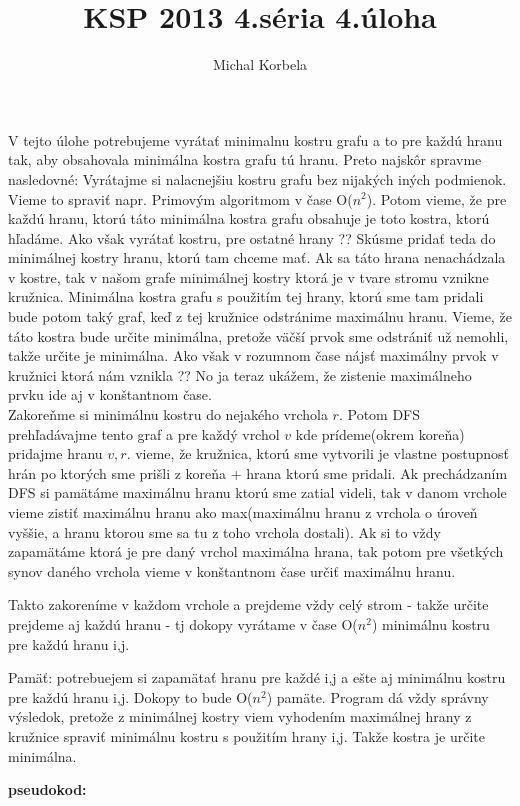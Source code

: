 \documentclass[a4paper,11pt]{article}
\title{KSP 2013 4.séria 4.úloha}
\author{Michal Korbela}
\begin{document}
V tejto úlohe potrebujeme vyrátať minimalnu kostru grafu a to pre každú hranu tak, aby obsahovala  minimálna kostra grafu tú hranu. Preto najskôr spravme nasledovné: Vyrátajme si nalacnejšiu kostru grafu bez nijakých iných podmienok. Vieme to spraviť napr. Primovým algoritmom v čase O($n^2$). Potom vieme, že pre každú hranu, ktorú táto minimálna kostra grafu obsahuje je toto kostra, ktorú hľadáme. Ako však vyrátať kostru, pre ostatné hrany ?? Skúsme pridať teda do minimálnej kostry hranu, ktorú tam chceme mať. Ak sa táto hrana nenachádzala v kostre, tak v našom grafe minimálnej kostry ktorá je v tvare stromu vznikne kružnica. Minimálna kostra grafu s použitím tej hrany, ktorú sme tam pridali bude potom taký graf, keď z tej kružnice odstránime maximálnu hranu. Vieme, že táto kostra bude určite minimálna, pretože väčší prvok sme odstrániť už nemohli, takže určite je minimálna. Ako však v rozumnom čase nájsť maximálny prvok v kružnici ktorá nám vznikla ?? No ja teraz ukážem, že zistenie maximálneho prvku ide aj v konštantnom čase.\\
Zakoreňme si minimálnu kostru do nejakého vrchola $r$. Potom DFS prehľadávajme tento graf a pre každý vrchol $v$ kde prídeme(okrem koreňa) pridajme hranu $v,r$. vieme, že kružnica, ktorú sme vytvorili je vlastne postupnosť hrán po ktorých sme prišli z koreňa + hrana ktorú sme pridali. Ak prechádzaním DFS si pamätáme maximálnu hranu ktorú sme zatial videli, tak v danom vrchole vieme zistiť maximálnu hranu ako max(maximálnu hranu z vrchola o úroveň vyššie, a hranu ktorou sme sa tu z toho vrchola dostali). Ak si to vždy zapamätáme ktorá je pre daný vrchol maximálna hrana, tak potom pre všetkých synov daného vrchola vieme v konštantnom čase určiť maximálnu hranu.

Takto zakoreníme v každom vrchole a prejdeme vždy celý strom - takže určite prejdeme aj každú hranu - tj dokopy vyrátame v čase O($n^2$) minimálnu kostru pre každú hranu i,j.

Pamäť: potrebuejem si zapamätať hranu pre každé i,j a ešte aj minimálnu kostru pre každú hranu i,j. Dokopy to bude O($n^2$) pamäte.
Program dá vždy správny výsledok, pretože z minimálnej kostry viem vyhodením maximálnej hrany z kružnice spraviť minimálnu kostru s použitím hrany i,j. Takže kostra je určite minimálna.

\textbf{pseudokod:}
\end{document}
